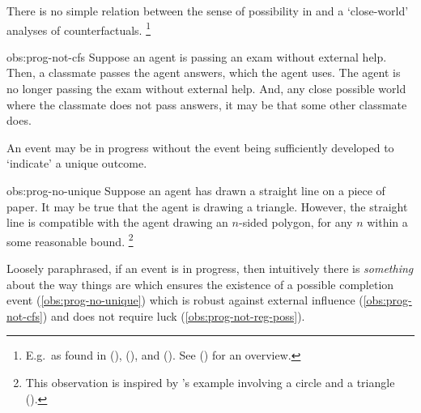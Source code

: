 \begin{note}
  \begin{observation}%
    \label{obs:prog-not-cfs}%
    There is no simple relation between the sense of possibility in \assuPP{} and a `close-world' analyses of counterfactuals.%
    \footnote{
      E.g.\ as found in (\cite{Todd:1964aa}), (\cite{Stalnaker:1968vt}), and (\cite{Lewis:1973th}).
      See (\cite[\S2]{Starr:2022aa}) for an overview.
    }
  \end{observation}
  \begin{motivation}{obs:prog-not-cfs}
    Suppose an agent is passing an exam without external help.
    Then, a classmate passes the agent answers, which the agent uses.
    The agent is no longer passing the exam without external help.
    And, any close possible world where the classmate does not pass answers, it may be that some other classmate does.
  \end{motivation}

  \begin{observation}%
    \label{obs:prog-no-unique}%
    An event may be in progress without the event being sufficiently developed to `indicate' a unique outcome.\newline
  \end{observation}
  \begin{motivation}{obs:prog-no-unique}
    Suppose an agent has drawn a straight line on a piece of paper.
    It may be true that the agent is drawing a triangle.
    However, the straight line is compatible with the agent drawing an \(n\)-sided polygon, for any \(n\) within a some reasonable bound.%
    \footnote{
      This observation is inspired by \citeauthor{Dowty:1979vq}'s example involving a circle and a triangle (\citeyear[133]{Dowty:1979vq}).
    }
  \end{motivation}

  \noindent%
  Loosely paraphrased, if an event is in progress, then intuitively there is \emph{something} about the way things are which ensures the existence of a possible completion event (\autoref{obs:prog-no-unique}) which is robust against external influence (\autoref{obs:prog-not-cfs}) and does not require luck (\autoref{obs:prog-not-reg-poss}).
\end{note}


